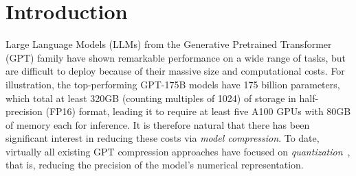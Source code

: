\documentclass{article}
\theoremstyle{plain}
\theoremstyle{definition}
\theoremstyle{remark}
\newcommand{\sparsegpt}[1]{\texttt{SparseGPT}}
\begin{document}

\printAffiliationsAndNotice{}

\begin{abstract}
We show for the first time that large-scale generative pretrained transformer (GPT) family models can be pruned to at least 50\% sparsity in \emph{one-shot, without any retraining}, at minimal loss of accuracy. 
This is achieved via a new pruning method called \sparsegpt{}, specifically designed to work efficiently and accurately on  massive GPT-family models.
We can execute \sparsegpt{} on the largest available open-source models, OPT-175B and BLOOM-176B, in under 4.5 hours, and can reach 60\% unstructured sparsity with negligible increase in perplexity: remarkably, more than 100 billion weights from these models can be ignored at inference time.
\sparsegpt{} generalizes to semi-structured (2:4 and 4:8) patterns,  and is compatible with weight quantization approaches. The code is available at: \url{https://github.com/IST-DASLab/sparsegpt}.
\end{abstract}

\section{Introduction}

Large Language Models (LLMs) from the Generative Pretrained Transformer (GPT) family have shown remarkable performance on a wide range of tasks, but are difficult to deploy because of their massive size and computational costs.  
For illustration, the top-performing GPT-175B models have 175 billion parameters, which total at least 320GB (counting multiples of 1024) of storage in half-precision (FP16) format, leading it to require at least five A100 GPUs with 80GB of memory each for inference. 
It is therefore natural that there has been significant interest in reducing these costs via \emph{model compression}. 
To date, virtually all existing GPT compression approaches have focused on \emph{quantization}~\cite{dettmers2022llm, yao2022zeroquant, xiao2022smoothquant, frantar2022gptq}, that is, reducing the precision of the model's numerical representation. 
\end{document}
